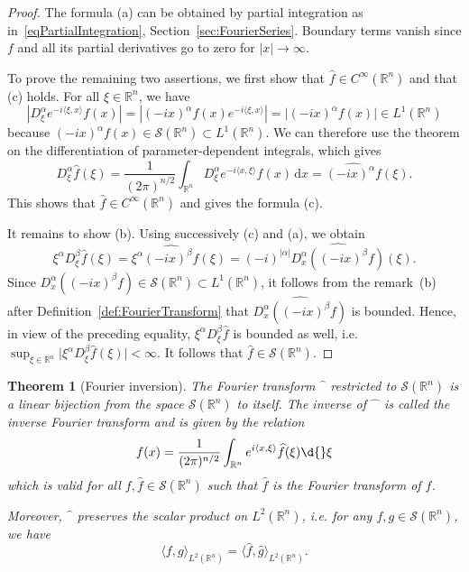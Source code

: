 \documentclass[12pt, oneside, a4paper]{article}
\newtheorem{thm}{Theorem}[section]
\theoremstyle{dfn}
\newcommand{\scalprod}[2]{\langle #1,#2 \rangle}
\def \S {\ensuremath{\mathcal{S}}}
\def \S {\ensuremath{\mathcal{S}}}
\def\Rbb{\ensuremath{\mathbb{R}}}
\def\dx{\,\mathrm dx}
\providecommand{\abs}[1]{\lvert#1\rvert}
\providecommand{\absbig}[1]{\big\lvert#1\big\rvert}
\providecommand{\Abs}[1]{\left\lvert#1\right\rvert}
\begin{document}
\begin{proof}
The formula (a) can be obtained by partial integration as in~\eqref{eqPartialIntegration}, Section~\ref{sec:FourierSeries}. Boundary terms vanish since $f$ and all its partial derivatives go to zero for $\abs{x} \to \infty$.

To prove the remaining two assertions, we first show that $\widehat{f} \in C^\infty(\Rbb^n)$ and that (c) holds. For all $\xi \in \Rbb^n$, we have
\[
\Abs{D^\alpha_\xi e^{-i\scalprod{\xi}{x}} f(x)} = \Abs{(-ix)^\alpha f(x) e^{-i\scalprod{\xi}{x}}} = \absbig{(-ix)^\alpha f(x)} \in L^1(\Rbb^n)
\]
because $(-ix)^\alpha f(x) \in \S(\Rbb^n) \subset L^1(\Rbb^n)$. We can therefore use the theorem on the differentiation of parameter-dependent integrals, which gives
\[
D^\alpha_\xi \widehat{f}(\xi)
= \frac{1}{(2\pi)^{n/2}} \int_{\Rbb^n} D^\alpha_\xi e^{-i \scalprod{x}{\xi}} f(x) \dx
= \widehat{(-ix)^\alpha f}(\xi).
\]
This shows that $\widehat{f} \in C^\infty(\Rbb^n)$ and gives the formula (c).

It remains to show (b). Using successively (c) and (a), we obtain
\[
\xi^\alpha D^\beta_\xi \widehat{f}(\xi)
= \xi^\alpha \widehat{(-ix)^\beta f}(\xi)
= (-i)^{\abs{\alpha}} \widehat{D^\alpha_x ((-ix)^\beta f) } (\xi).
\]
Since $D^\alpha_x((-ix)^\beta f) \in \S(\Rbb^n) \subset L^1(\Rbb^n)$, it follows from the remark~(b) after Definition~\ref{def:FourierTransform} that $\widehat{D^\alpha_x ((-ix)^\beta f) }$ is bounded. Hence, in view of the preceding equality, $\xi^\alpha D^\beta_\xi \widehat{f}$ is bounded as well, i.e. $\sup_{\xi \in \Rbb^n} \absbig{\xi^\alpha D^\beta_\xi \widehat{f}(\xi)} < \infty$. It follows that $\widehat{f} \in \S(\Rbb^n)$.
\end{proof}

\begin{thm}[Fourier inversion]\label{Theo:FourierInversion}
The Fourier transform $\widehat{\phantom{g}}$ restricted to $\S(\Rbb^n)$ is a linear bijection from the space $\S(\Rbb^n)$ to itself. The inverse of $\widehat{\phantom{w}}$ is called the \emph{inverse Fourier transform} and is given by the relation
\begin{equation}\label{eq:FourierInversion1}
f(x) = \frac{1}{(2\pi)^{n/2}} \int_{\Rbb^n} e^{i\scalprod{x}{\xi}} \widehat{f} (\xi) \d{}\xi
\end{equation}
which is valid for all $f,\widehat{f} \in \S(\Rbb^n)$ such that $\widehat{f}$ is the Fourier transform of $f$.

Moreover, $\widehat{\phantom{g}}$ preserves the scalar product on $L^2(\Rbb^n)$, i.e. for any $f,g \in \S(\Rbb^n)$, we have
\begin{equation}\label{eq:FourierInversion2}
\scalprod{f}{g}_{L^2(\Rbb^n)} = \scalprod{\widehat{f}}{\widehat{g}}_{L^2(\Rbb^n)}.
\end{equation}
\end{thm}
\end{document}
